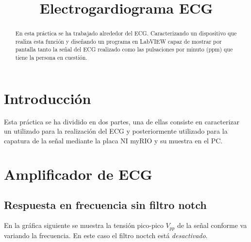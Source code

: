 \documentclass[conference]{IEEEtran}
\begin{document}
\graphicspath{{./figures/}}

\title{Electrogardiograma ECG}

\author{
\and
{}
}

\maketitle

\begin{abstract}
En esta práctica se ha trabajado alrededor del ECG. Caracterizando un dispositivo que realiza esta función y diseñando un programa en LabVIEW capaz de mostrar por pantalla tanto la señal del ECG realizado como las pulsaciones por minuto (ppm) que tiene la persona en cuestión.
\end{abstract}

\section{Introducción}
Esta práctica se ha dividido en dos partes, una de ellas consiste en caracterizar un utilizado para la realización del ECG y posteriormente utilizado para la capatura de la señal mediante la placa NI myRIO y su muestra en el PC.

\section{Amplificador de ECG}
\subsection{Respuesta en frecuencia sin filtro notch}
En la gráfica siguiente se muestra la tensión pico-pico $V_{pp}$ de la señal conforme va variando la frecuencia. En este caso el filtro noctch está \textit{desactivado}. 
\newline
\end{document}
